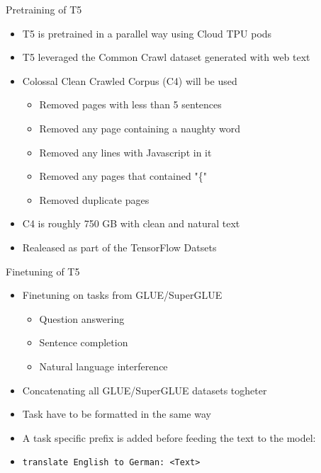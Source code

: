 \documentclass[english]{mlutalk}
\begin{document}
\begin{frame}{Pretraining of T5}
  \begin{itemize}
    \item T5 is pretrained in a parallel way using Cloud TPU pods
    \item T5 leveraged the Common Crawl dataset generated with web text
    \item Colossal Clean Crawled Corpus (C4) will be used
    \begin{itemize}
      \item Removed pages with less than 5 sentences 
      \item Removed any page containing a naughty word 
      \item Removed any lines with Javascript in it
      \item Removed any pages that contained "\{"
      \item Removed duplicate pages
    \end{itemize}
    \item C4 is roughly 750 GB with clean and natural text
    \item Realeased as part of the TensorFlow Datsets
  \end{itemize}
\end{frame}

\begin{frame}{Finetuning of T5}
    \begin{itemize}
      \item Finetuning on tasks from GLUE/SuperGLUE
      \begin{itemize}
        \item Question answering
        \item Sentence completion
        \item Natural language interference
      \end{itemize}
      \item Concatenating all GLUE/SuperGLUE datasets togheter
      \item Task have to be formatted in the same way
      \item A task specific prefix is added before feeding the text to the model:
      \item \texttt{translate English to German: <Text>}
    \end{itemize}
\end{frame}
\end{document}
